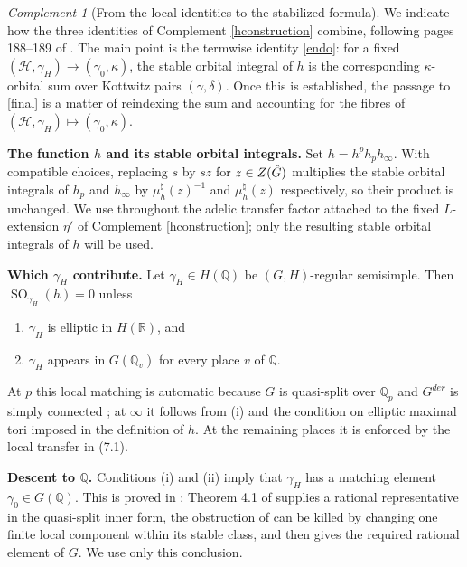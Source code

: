 \documentclass[11pt,a4paper]{article}
\theoremstyle{definition}
\theoremstyle{plain}
\theoremstyle{remark}
\newtheorem{Rc}[shared]{Complement}
\theoremstyle{plain}
\DeclareMathOperator{\SO}{SO}
\begin{document}
\begin{Rc}[From the local identities to the stabilized formula]\label{route72}
    We indicate how the three identities of Complement \ref{hconstruction} combine, following pages 188--189 of \cite{MR1044820}. The main point is the termwise identity \eqref{endo}: for a fixed $(\mathcal H,\gamma_H)\to(\gamma_0,\kappa)$, the stable orbital integral of $h$ is the corresponding $\kappa$-orbital sum over Kottwitz pairs $(\gamma,\delta)$. Once this is established, the passage to \eqref{final} is a matter of reindexing the sum and accounting for the fibres of $(\mathcal H,\gamma_H)\mapsto(\gamma_0,\kappa)$.

    \textbf{The function $h$ and its stable orbital integrals.} Set $h = h^p h_p h_{\infty}$. With compatible choices, replacing $s$ by $sz$ for $z \in Z(\Hat{G})$ multiplies the stable orbital integrals of $h_p$ and $h_{\infty}$ by $\mu_h^{\natural}(z)^{-1}$ and $\mu_h^{\natural}(z)$ respectively, so their product is unchanged. We use throughout the adelic transfer factor attached to the fixed $L$-extension $\eta'$ of Complement \ref{hconstruction}; only the resulting stable orbital integrals of $h$ will be used.

    \textbf{Which $\gamma_H$ contribute.} Let $\gamma_H \in H(\mathbb{Q})$ be $(G,H)$-regular semisimple. Then $\SO_{\gamma_H}(h) = 0$ unless
    \begin{enumerate}
        \item[(i)] $\gamma_H$ is elliptic in $H(\mathbb{R})$, and
        \item[(ii)] $\gamma_H$ appears in $G(\mathbb{Q}_v)$ for every place $v$ of $\mathbb{Q}$.
    \end{enumerate}
    At $p$ this local matching is automatic because $G$ is quasi-split over $\mathbb{Q}_p$ and $G^{der}$ is simply connected \cite[Theorem 4.1]{MR683003}; at $\infty$ it follows from (i) and the condition on elliptic maximal tori imposed in the definition of $h$. At the remaining places it is enforced by the local transfer in (7.1).

    \textbf{Descent to $\mathbb{Q}$.} Conditions (i) and (ii) imply that $\gamma_H$ has a matching element $\gamma_0\in G(\mathbb{Q})$. This is proved in \cite[p.~188]{MR1044820}: Theorem 4.1 of \cite{MR683003} supplies a rational representative in the quasi-split inner form, the obstruction of \cite[\S6.5]{MR858284} can be killed by changing one finite local component within its stable class, and \cite[Theorem 6.6]{MR858284} then gives the required rational element of $G$. We use only this conclusion.


\end{Rc}
\end{document}
